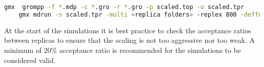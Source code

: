 \begin{lstlisting}[language=sh, basicstyle=\ttfamily\small, breaklines=true]
    gmx  grompp -f *.mdp -c *.gro -r *.gro -p scaled.top -o scaled.tpr
    gmx mdrun -s scaled.tpr -multi <replica folders> -replex 800 -deffnm replica -plumed plumed.dat
\end{lstlisting}


At the start of the simulations it is best practice to check the acceptance ratios between replicas to ensure that the scaling is not too aggressive nor too weak. 
A minimum of 20\% acceptance ratio is recommended for the simulations to be considered valid.